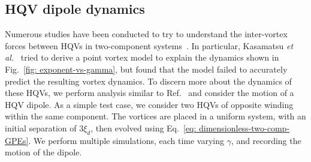 \subsection{HQV dipole dynamics}
Numerous studies have been conducted to try to understand the inter-vortex
forces between HQVs in two-component systems~\cite{Eto2011, Kasamatsu2016}.
In particular, Kasamatsu \textit{et al.}~\cite{Kasamatsu2016} tried to derive a
point vortex model to explain the dynamics shown in
Fig.~\ref{fig: exponent-vs-gamma}, but found that the model failed to accurately
predict the resulting vortex dynamics.
To discern more about the dynamics of these HQVs, we perform analysis similar to
Ref.~\cite{Kasamatsu2016} and consider the motion of a HQV dipole.
As a simple test case, we consider two HQVs of opposite winding within the same
component.
The vortices are placed in a uniform system, with an initial separation of
\(3\xi_d\), then evolved using Eq.~\eqref{eq: dimensionless-two-comp-GPEs}.
We perform multiple simulations, each time varying \(\gamma \), and recording
the motion of the dipole.

